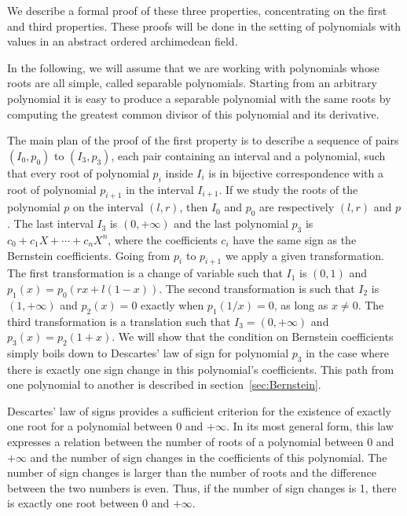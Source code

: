 \documentclass{mscs}
\begin{document}
We describe a formal proof of these three properties,
concentrating on the first and third properties. These proofs will be
done in the setting of polynomials with values in an abstract ordered
archimedean field.

In the following, we will assume that we are working with polynomials
whose roots are all simple, called separable polynomials.
Starting from an arbitrary polynomial it is easy to produce a
separable polynomial with the same roots by computing the greatest
common divisor of this polynomial and its derivative.


The main plan of the proof of the first property is to describe a
sequence of pairs \((I_0, p_0)\) to \((I_3, p_3)\), each pair
containing an interval and a polynomial, such that every root of
polynomial \(p_i\) inside \(I_i\) is in bijective correspondence with
a root of polynomial \(p_{i+1}\) in the interval \(I_{i+1}\).  If we
study the roots of the polynomial $p$ on the interval $(l, r)$,
then $I_0$ and $p_0$ are respectively $(l, r)$ and $p$.
The last interval $I_3$ is \((0, +\infty)\) and the last polynomial
$p_3$ is \(c_0 + c_1 X + \cdots + c_n X^n\), where the coefficients
\(c_i\) have the
same sign as the Bernstein coefficients.  Going from \(p_i\) to
\(p_{i+1}\) we apply a given transformation.  The first transformation
is a change of variable such that \(I_1\) is \((0,1)\) and \(p_1(x) =
p_0(r x + l (1 - x))\).  The second transformation is such that
\(I_2\) is \((1,+\infty)\) and \(p_2(x) = 0\) exactly when \(p_1(1/x)
= 0\), as long as \(x\neq 0\).  The third transformation is a
translation such that \(I_3 = (0,+\infty)\) and \(p_3(x) = p_2(1+x)\).
We will show that the condition on Bernstein coefficients simply
boils down to Descartes' law of sign \cite{descartes, bpr} for
polynomial \(p_3\) in the
case where there is exactly one sign change in this polynomial's coefficients.
This path from one polynomial to another is described in section~\ref{sec:Bernstein}.

Descartes' law of signs provides a sufficient criterion for the
existence of exactly one root for a polynomial
between 0 and \(+\infty\).  In its
most general form, this law
expresses a relation between the number of roots of a polynomial
between 0 and \(+\infty\) and the number of sign changes in the
coefficients of this polynomial.  The number of sign changes is larger
than the number of roots and the difference between the two numbers is
even.  Thus, if the number of sign changes is 1, there is
exactly one root between 0 and \(+\infty\).
\end{document}
